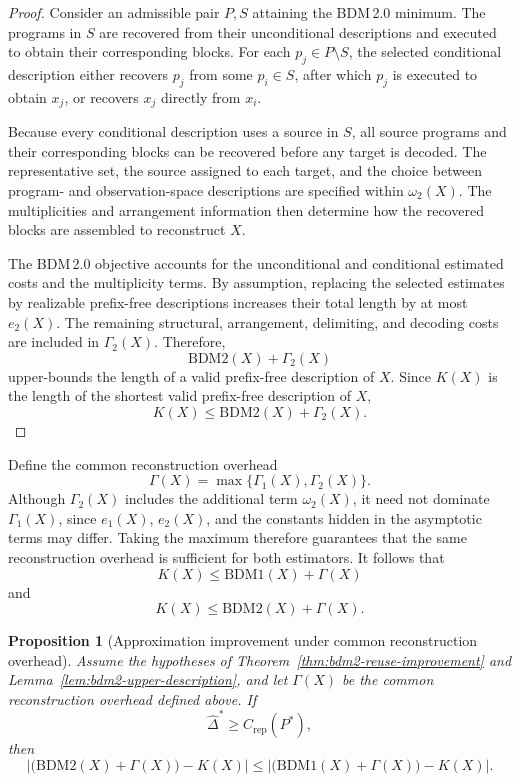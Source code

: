 \documentclass{article}
\newtheorem{proposition}{Proposition}
\begin{document}
\begin{proof}
Consider an admissible pair \(P,S\) attaining the BDM\,2.0 minimum. The programs in \(S\) are recovered from their unconditional descriptions and executed to obtain their corresponding blocks. For each \(p_j\in P\setminus S\), the selected conditional description either recovers \(p_j\) from some \(p_i\in S\), after which \(p_j\) is executed to obtain \(x_j\), or recovers \(x_j\) directly from \(x_i\).

Because every conditional description uses a source in \(S\), all source programs and their corresponding blocks can be recovered before any target is decoded. The representative set, the source assigned to each target, and the choice between program- and observation-space descriptions are specified within \(\omega_2(X)\). The multiplicities and arrangement information then determine how the recovered blocks are assembled to reconstruct \(X\).

The BDM\,2.0 objective accounts for the unconditional and conditional estimated costs and the multiplicity terms. By assumption, replacing the selected estimates by realizable prefix-free descriptions increases their total length by at most \(e_2(X)\). The remaining structural, arrangement, delimiting, and decoding costs are included in \(\Gamma_2(X)\). Therefore,
\[
\mathrm{BDM2}(X)+\Gamma_2(X)
\]
upper-bounds the length of a valid prefix-free description of \(X\). Since \(K(X)\) is the length of the shortest valid prefix-free description of \(X\),
\[
K(X)
\leq
\mathrm{BDM2}(X)+\Gamma_2(X).
\]
\end{proof}

Define the common reconstruction overhead
\[
\Gamma(X)
=
\max\{\Gamma_1(X),\Gamma_2(X)\}.
\]
Although \(\Gamma_2(X)\) includes the additional term \(\omega_2(X)\), it need not dominate \(\Gamma_1(X)\), since \(e_1(X)\), \(e_2(X)\), and the constants hidden in the asymptotic terms may differ. Taking the maximum therefore guarantees that the same reconstruction overhead is sufficient for both estimators. It follows that
\[
K(X)
\leq
\mathrm{BDM1}(X)+\Gamma(X)
\]
and
\[
K(X)
\leq
\mathrm{BDM2}(X)+\Gamma(X).
\]

\begin{proposition}[Approximation improvement under common reconstruction overhead]
\label{prop:bdm2-closer-to-k}
Assume the hypotheses of Theorem~\ref{thm:bdm2-reuse-improvement} and Lemma~\ref{lem:bdm2-upper-description}, and let \(\Gamma(X)\) be the common reconstruction overhead defined above. If
\[
\hat{\Delta}^{*}
\geq
C_{\mathrm{rep}}(P^*),
\]
then
\[
\left|
\bigl(\mathrm{BDM2}(X)+\Gamma(X)\bigr)-K(X)
\right|
\leq
\left|
\bigl(\mathrm{BDM1}(X)+\Gamma(X)\bigr)-K(X)
\right|.
\]
\end{proposition}
\end{document}
